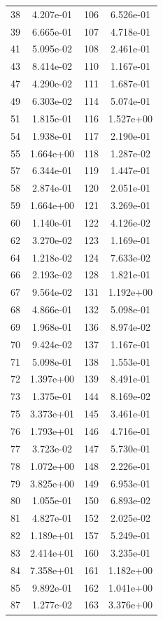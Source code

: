 \documentclass[12pt]{article}
\begin{document}
\begin{longtable}{@{}cccc@{}}
38 & 4.207e-01 & 106 & 6.526e-01 \\
39 & 6.665e-01 & 107 & 4.718e-01 \\
41 & 5.095e-02 & 108 & 2.461e-01 \\
43 & 8.414e-02 & 110 & 1.167e-01 \\
47 & 4.290e-02 & 111 & 1.687e-01 \\
49 & 6.303e-02 & 114 & 5.074e-01 \\
51 & 1.815e-01 & 116 & 1.527e+00 \\
54 & 1.938e-01 & 117 & 2.190e-01 \\
55 & 1.664e+00 & 118 & 1.287e-02 \\
57 & 6.344e-01 & 119 & 1.447e-01 \\
58 & 2.874e-01 & 120 & 2.051e-01 \\
59 & 1.664e+00 & 121 & 3.269e-01 \\
60 & 1.140e-01 & 122 & 4.126e-02 \\
62 & 3.270e-02 & 123 & 1.169e-01 \\
64 & 1.218e-02 & 124 & 7.633e-02 \\
66 & 2.193e-02 & 128 & 1.821e-01 \\
67 & 9.564e-02 & 131 & 1.192e+00 \\
68 & 4.866e-01 & 132 & 5.098e-01 \\
69 & 1.968e-01 & 136 & 8.974e-02 \\
70 & 9.424e-02 & 137 & 1.167e-01 \\
71 & 5.098e-01 & 138 & 1.553e-01 \\
72 & 1.397e+00 & 139 & 8.491e-01 \\
73 & 1.375e-01 & 144 & 8.169e-02 \\
75 & 3.373e+01 & 145 & 3.461e-01 \\
76 & 1.793e+01 & 146 & 4.716e-01 \\
77 & 3.723e-02 & 147 & 5.730e-01 \\
78 & 1.072e+00 & 148 & 2.226e-01 \\
79 & 3.825e+00 & 149 & 6.953e-01 \\
80 & 1.055e-01 & 150 & 6.893e-02 \\
81 & 4.827e-01 & 152 & 2.025e-02 \\
82 & 1.189e+01 & 157 & 5.249e-01 \\
83 & 2.414e+01 & 160 & 3.235e-01 \\
84 & 7.358e+01 & 161 & 1.182e+00 \\
85 & 9.892e-01 & 162 & 1.041e+00 \\
87 & 1.277e-02 & 163 & 3.376e+00 \\

\end{longtable}
\end{document}
